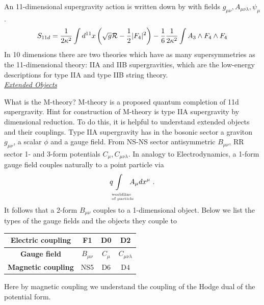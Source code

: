 \documentclass[12pt]{article}
\def\be{\begin{eqnarray}}\def\ba{\begin{eqnarray}}
\def\ee{\end{eqnarray}}\def\ea{\end{eqnarray}}
\def\calR{{\cal R}}\def\caL{{\cal L}}
\begin{document}
An 11-dimensional supergravity action is written down by \cite{CJS} with fields $g_{\mu\nu}, A_{\mu\nu\lambda},\psi_\mu$.
\be
S_{11d} = \frac{1}{2 \kappa^2}\int d^{11} x \left(\sqrt{g} \calR -\frac{1}{2}|F_4|^2\right)-\frac{1}{6}\frac{1}{2 \kappa^2} \int A_3 \wedge F_4 \wedge F_4 
\ee
In 10 dimensions there are two theories which have as many supersymmetries as the 11-dimensional
theory: IIA and IIB supergravities, which are the low-energy descriptions for type IIA and type IIB 
string theory.
%
\\

\noindent\underline{\large \it Extended Objects}

What is the M-theory? M-theory is a proposed quantum completion of 11d supergravity. 
Hint for construction of M-theory is type IIA supergravity by dimensional reduction. To do this, it is helpful to understand extended objects and their couplings.
Type IIA supergravity has in the bosonic sector a graviton $g_{\mu\nu}$, a scalar $\phi$ and a gauge field. 
From NS-NS sector antisymmetric $B_{\mu\nu}$, RR sector 1- and 3-form potentials $C_\mu, C_{\mu\nu\lambda}$. 
In analogy to Electrodynamics, a 1-form gauge field couples naturally to a point particle via
\[
	q \, \int_{
\raisebox{-0.4cm}{\hspace{-0.5cm}
\begin{minipage}{1.5cm}\tiny
worldline\\
of particle
\end{minipage}}} \hspace{-0.7cm} A_\mu dx^\mu~.
\]
It follows that a 2-form $B_{\mu\nu}$ couples to a 1-dimensional object. 
Below we list the types of the gauge fields and the objects they couple to
\begin{center}
\begin{tabular}{|c|c|c|c|}
\hline
\textbf{Electric coupling}    &  F1 & D0 & D2 \\
\hline
\textbf{Gauge field}           & $B_{\mu\nu}$ & $C_\mu$ & $C_{\mu\nu\lambda}$ \\
\hline
\textbf{Magnetic coupling} & NS5 & D6 & D4  \\
\hline
\end{tabular}
\end{center}
Here by magnetic coupling we understand the coupling of the Hodge dual of the potential form.
\end{document}

